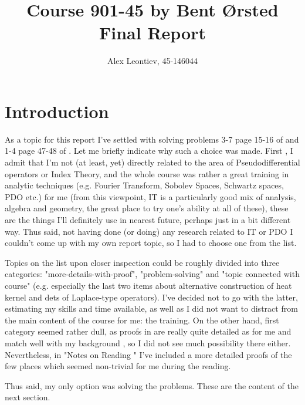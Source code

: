 \documentclass[10pt]{article} %
\title{Course 901-45 by Bent Ørsted\\Final Report}
\author{Alex Leontiev, 45-146044}
\begin{document}
\begin{CJK}{UTF8}{bsmi}
\maketitle
\end{CJK}
\section{Introduction}
As a topic for this report I've settled with solving problems 3-7 page 15-16 of \cite{met-sobolev}
and 1-4 page 47-48 of \cite{met-fa}. Let me briefly indicate why such a choice was made. First
, I admit that I'm not (at least, yet) directly related to the area of Pseudodifferential operators or Index Theory, and the whole
course was rather a great training in analytic techniques (e.g. Fourier Transform, Sobolev Spaces, Schwartz spaces, PDO etc.) for me
(from this viewpoint, IT is a particularly good mix of analysis, algebra and geometry, the great place to try one's ability at all
of these), these are the things I'll definitely use in nearest future, perhaps just in a bit different way. Thus said, not having
done (or doing) any research related to IT or PDO I couldn't come up with my own report topic, so I had to choose one from the list.

Topics on the list upon closer inspection could be roughly divided into three categories: "more-details-with-proof", "problem-solving"
and "topic connected with course" (e.g. especially the last two items about alternative construction of heat kernel and dets of
Laplace-type operators). I've decided not to go with the latter, estimating my skills and time available, as well as I did not want
to distract from the main content of the course for me: the training. On the other hand, first category seemed rather dull, as
proofs in \cite{gilkey} are really quite detailed as for me and match well with my background
, so I did not see much possibility there either. Nevertheless, in "Notes
on Reading \cite{gilkey}" I've included a more detailed proofs of the few places which seemed non-trivial for me during the reading.

Thus said, my only option was solving the problems. These are the content of the next section.
\end{document}
